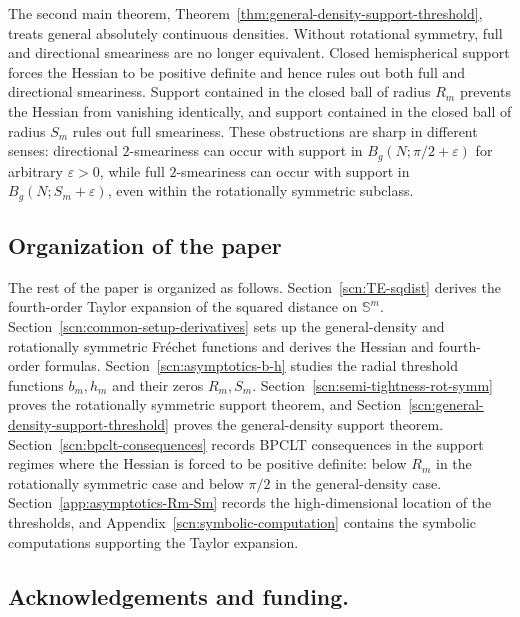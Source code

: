 \documentclass{amsart}
\theoremstyle{definition}
\theoremstyle{remark}
\newcommand\0{\boldsymbol{0}}
\begin{document}
The second main theorem, Theorem~\ref{thm:general-density-support-threshold}, treats general absolutely continuous densities.  Without rotational symmetry, full and directional smeariness are no longer equivalent.  Closed hemispherical support forces the Hessian to be positive definite and hence rules out both full and directional smeariness.  Support contained in the closed ball of radius \(R_m\) prevents the Hessian from vanishing identically, and support contained in the closed ball of radius \(S_m\) rules out full smeariness.  These obstructions are sharp in different senses: directional \(2\)-smeariness can occur with support in \(B_g(N;\pi/2+\varepsilon)\) for arbitrary \(\varepsilon>0\), while full \(2\)-smeariness can occur with support in \(B_g(N;S_m+\varepsilon)\), even within the rotationally symmetric subclass.
\subsection{Organization of the paper} The rest of the paper is organized as follows.  Section~\ref{scn:TE-sqdist} derives the fourth-order Taylor expansion of the squared distance on \(\mathbb S^m\).  Section~\ref{scn:common-setup-derivatives} sets up the general-density and rotationally symmetric Fr\'echet functions and derives the Hessian and fourth-order formulas.  Section~\ref{scn:asymptotics-b-h} studies the radial threshold functions \(b_m,h_m\) and their zeros \(R_m,S_m\).  Section~\ref{scn:semi-tightness-rot-symm} proves the rotationally symmetric support theorem, and Section~\ref{scn:general-density-support-threshold} proves the general-density support theorem. Section~\ref{scn:bpclt-consequences} records BPCLT consequences in the support regimes where the Hessian is forced to be positive definite: below \(R_m\) in the rotationally symmetric case and below \(\pi/2\) in the general-density case. Section~\ref{app:asymptotics-Rm-Sm} records the high-dimensional location of the thresholds, and Appendix~\ref{scn:symbolic-computation} contains the symbolic computations supporting the Taylor expansion.

\subsection{{Acknowledgements and funding.}}
\end{document}
